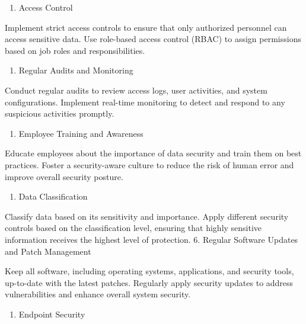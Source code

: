 \documentclass[
  letterpaper,
  DIV=11,
  numbers=noendperiod]{scrreprt}
\providecommand{\tightlist}{%
  \setlength{\itemsep}{0pt}\setlength{\parskip}{0pt}}\usepackage{longtable,booktabs,array}
\begin{document}
\begin{enumerate}
\def\labelenumi{\arabic{enumi}.}
\setcounter{enumi}{1}
\tightlist
\item
  Access Control
\end{enumerate}

Implement strict access controls to ensure that only authorized
personnel can access sensitive data. Use role-based access control
(RBAC) to assign permissions based on job roles and responsibilities.

\begin{enumerate}
\def\labelenumi{\arabic{enumi}.}
\setcounter{enumi}{2}
\tightlist
\item
  Regular Audits and Monitoring
\end{enumerate}

Conduct regular audits to review access logs, user activities, and
system configurations. Implement real-time monitoring to detect and
respond to any suspicious activities promptly.

\begin{enumerate}
\def\labelenumi{\arabic{enumi}.}
\setcounter{enumi}{3}
\tightlist
\item
  Employee Training and Awareness
\end{enumerate}

Educate employees about the importance of data security and train them
on best practices. Foster a security-aware culture to reduce the risk of
human error and improve overall security posture.

\begin{enumerate}
\def\labelenumi{\arabic{enumi}.}
\setcounter{enumi}{4}
\tightlist
\item
  Data Classification
\end{enumerate}

Classify data based on its sensitivity and importance. Apply different
security controls based on the classification level, ensuring that
highly sensitive information receives the highest level of protection.
6. Regular Software Updates and Patch Management

Keep all software, including operating systems, applications, and
security tools, up-to-date with the latest patches. Regularly apply
security updates to address vulnerabilities and enhance overall system
security.

\begin{enumerate}
\def\labelenumi{\arabic{enumi}.}
\setcounter{enumi}{7}
\tightlist
\item
  Endpoint Security
\end{enumerate}
\end{document}
